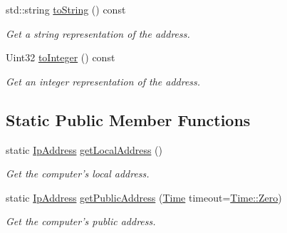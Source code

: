 \begin{DoxyCompactItemize}
std\-::string \hyperlink{classsf_1_1IpAddress_a52f4be92fb0ceb689abc469e4a85fd82}{to\-String} () const 
\begin{DoxyCompactList}\small\item\em Get a string representation of the address. \end{DoxyCompactList}\item 
Uint32 \hyperlink{classsf_1_1IpAddress_af42678b08b23def2560aed7d98b24d89}{to\-Integer} () const 
\begin{DoxyCompactList}\small\item\em Get an integer representation of the address. \end{DoxyCompactList}\end{DoxyCompactItemize}
\subsection*{Static Public Member Functions}
\begin{DoxyCompactItemize}
\item 
static \hyperlink{classsf_1_1IpAddress}{Ip\-Address} \hyperlink{classsf_1_1IpAddress_a4c31622ad87edca48adbb8e8ed00ee4a}{get\-Local\-Address} ()
\begin{DoxyCompactList}\small\item\em Get the computer's local address. \end{DoxyCompactList}\item 
static \hyperlink{classsf_1_1IpAddress}{Ip\-Address} \hyperlink{classsf_1_1IpAddress_a5c5cbf67e4aacf23c24f2ad991df4c55}{get\-Public\-Address} (\hyperlink{classsf_1_1Time}{Time} timeout=\hyperlink{classsf_1_1Time_a8db127b632fa8da21550e7282af11fa0}{Time\-::\-Zero})
\begin{DoxyCompactList}\small\item\em Get the computer's public address. \end{DoxyCompactList}\end{DoxyCompactItemize}
